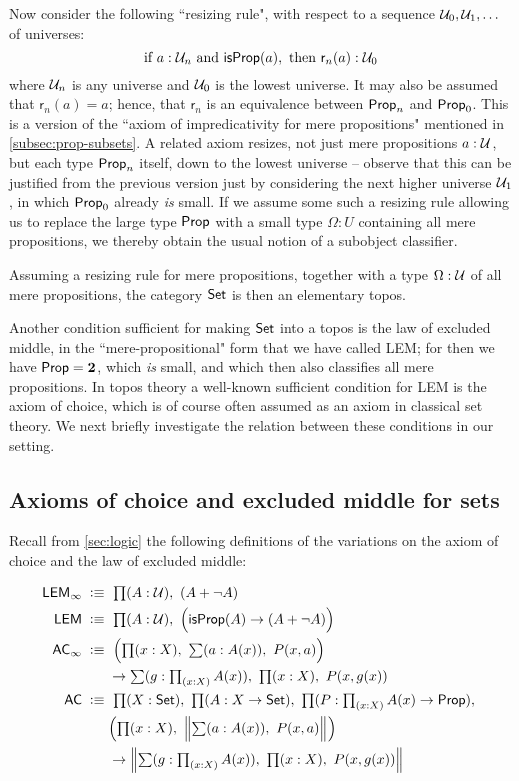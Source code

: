 Now consider the following ``resizing rule", with respect to a sequence $\mathcal{U}_0, \mathcal{U}_1, \ldots$ of universes:
\[\text{if } a:\mathcal{U}_n \text{ and\ } \mathsf{isProp}(a), \text{ then } \mathsf{r}_{n}(a): \mathcal{U}_0\]
where $\mathcal{U}_n$ is any universe and $\mathcal{U}_0$ is the lowest universe.
It may also be assumed that $\mathsf{r}_{n}(a) = a$; hence, that $\mathsf{r}_n$ is an equivalence between $\mathsf{Prop}_n$ and $\mathsf{Prop}_0$. 
This is a version of the ``axiom of impredicativity for mere propositions" mentioned in \autoref{subsec:prop-subsets}.  A related axiom resizes, not just mere propositions $a:\mathcal{U}$, but each type $\mathsf{Prop}_n$ itself, down to the lowest universe -- observe that this can be justified from the previous version just by considering the next higher universe $\mathcal{U}_1$, in which $\mathsf{Prop}_0$ already \emph{is} small.
If we assume some such a resizing rule allowing us to replace the large type $\mathsf{Prop}$ with a small type $\Omega:U$ containing all mere propositions, we thereby obtain the usual notion of a subobject classifier.
 
 \begin{thm}\label{thm:settopos} Assuming a resizing rule for mere propositions, together with a type $\Omega:\mathcal{U}$ of all mere propositions, the category $\mathsf{Set}$ is then an elementary  topos.
 \end{thm}

Another condition sufficient for making $\mathsf{Set}$ into a topos is the law of excluded middle, in the ``mere-propositional" form that we have called LEM; for then we have $\mathsf{Prop} = \mathbf{2}$, which \emph{is} small, and which then also classifies all mere propositions.
In topos theory a well-known sufficient condition for LEM is the axiom of choice, which is of course often assumed as an axiom in classical set theory. We next briefly investigate the relation between these conditions in our setting.

\subsection{Axioms of choice and excluded middle for sets}
\label{subsec:emacinsets}

Recall from \autoref{sec:logic}  the following definitions of the variations on the axiom of choice and the law of excluded middle:

\begin{align*}
 \mathsf{LEM}_\infty\;\defeq\;&\ 
  \prd{A:\UU} (A + \neg A)\\
  \mathsf{LEM}\;\defeq\;&\ 
  \prd{A:\UU} \Big(\isprop(A) \to (A + \neg A)\Big)\\
  \mathsf{AC}_\infty\;\defeq\;&\ 
    \Big(\prd{x:X} \sm{a:A(x)} P(x,a)\Big) \\
    & \to\sm{g:\prd{x:X} A(x)} \prd{x:X} P(x,g(x))\\
   \mathsf{AC}\;\defeq\;&\ 
    \prd{X:\set}  \prd{A:X\to\set} \prd{P:\prd{x:X}A(x)\to\prop} \\
    & \Big(\prd{x:X} \Brck{\sm{a:A(x)} P(x,a)}\Big) \\
    & \to\Brck{\sm{g:\prd{x:X} A(x)} \prd{x:X} P(x,g(x))}
\end{align*}

